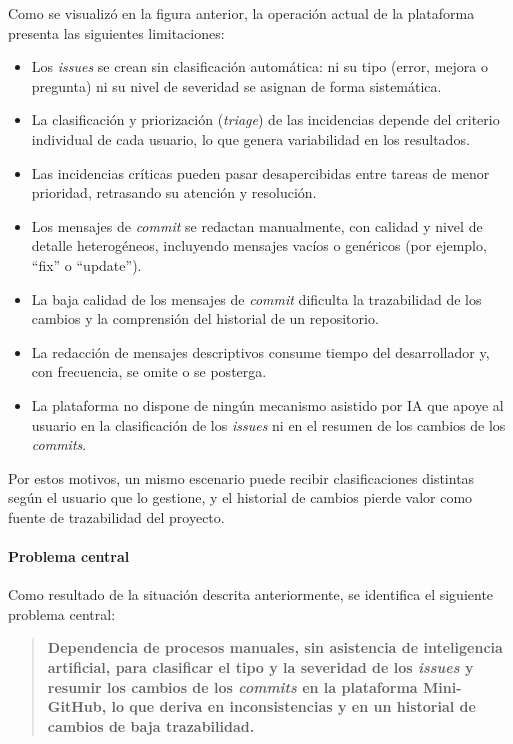 Como se visualizó en la figura anterior, la operación actual de la plataforma presenta las siguientes limitaciones:

\begin{itemize}
    \item Los \textit{issues} se crean sin clasificación automática: ni su tipo (error, mejora o pregunta) ni su nivel de severidad se asignan de forma sistemática.

    \item La clasificación y priorización (\textit{triage}) de las incidencias depende del criterio individual de cada usuario, lo que genera variabilidad en los resultados.

    \item Las incidencias críticas pueden pasar desapercibidas entre tareas de menor prioridad, retrasando su atención y resolución.

    \item Los mensajes de \textit{commit} se redactan manualmente, con calidad y nivel de detalle heterogéneos, incluyendo mensajes vacíos o genéricos (por ejemplo, ``fix'' o ``update'').

    \item La baja calidad de los mensajes de \textit{commit} dificulta la trazabilidad de los cambios y la comprensión del historial de un repositorio.

    \item La redacción de mensajes descriptivos consume tiempo del desarrollador y, con frecuencia, se omite o se posterga.

    \item La plataforma no dispone de ningún mecanismo asistido por \acrshort{IA} que apoye al usuario en la clasificación de los \textit{issues} ni en el resumen de los cambios de los \textit{commits}.
\end{itemize}

Por estos motivos, un mismo escenario puede recibir clasificaciones distintas según el usuario que lo gestione, y el historial de cambios pierde valor como fuente de trazabilidad del proyecto.

\paragraph{Problema central}

Como resultado de la situación descrita anteriormente, se identifica el siguiente problema central:

\begin{quote}
\textbf{Dependencia de procesos manuales, sin asistencia de inteligencia artificial, para clasificar el tipo y la severidad de los \textit{issues} y resumir los cambios de los \textit{commits} en la plataforma Mini-GitHub, lo que deriva en inconsistencias y en un historial de cambios de baja trazabilidad.}
\end{quote}

